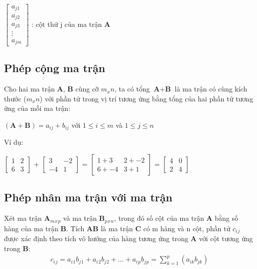 	\hspace{5mm}
	$\begin{bmatrix}	
		 a_{j1} \\ a_{j2}\\ a_{j3} \\ \vdots \\ a_{jm}		\end{bmatrix}$ : 
	  cột thứ j của ma trận \textbf{A}\\

\subsection{Phép cộng ma trận}
Cho hai ma trận \textbf{A}, \textbf{B} cùng cỡ  $ m_x n$, ta có tổng $\textbf{A} + \textbf{B}$ là ma trận có cùng kích thước ($m_x n$) với phần tử trong vị trí tương ứng bằng tổng của hai phần tử tương ứng của mỗi ma trận:
\begin{center}
$(\textbf{A}+\textbf{B}) = a_{ij}+b_{ij}$ với $ 1 \leq i \leq m$ và $1 \leq j \leq n$

\end{center}

Ví dụ:

$\begin{bmatrix}
   1 & 2 \\6 & 3
\end{bmatrix}$
+ 
$\begin{bmatrix}
3 & -2 \\
-4 & 1
\end{bmatrix}$
=
$\begin{bmatrix}
1+3 & 2 + -2 \\
6+-4 & 3+1
\end{bmatrix}$
=
$\begin{bmatrix}
4& 0\\
2 & 4
\end{bmatrix}$


\subsection{Phép nhân ma trận với ma trận}
Xét ma trận $\textbf{A}_m{}_x{}_p$ và ma trận \textbf{B}$_p{}_x{}_n$, trong đó số cột của ma trận \textbf{A} bằng số hàng của ma trận \textbf{B}.
Tích \textbf{A}\textbf{B} là ma trận \textbf{C} có m hàng và n cột, phần tử $c_i{}_j$ được xác định theo tích vô hướng của hàng tương ứng trong \textbf{A} với cột tương ứng trong \textbf{B}: 
\begin{align*}
c_i{}_j = a_i{}_1b_j{}_1 + a_i{}_2b_j{}_2 + \ldots + a_i{}_pb_j{}_p=
\sum_{k=1}^p(a_{ik}b_{jk})
\end{align*}


